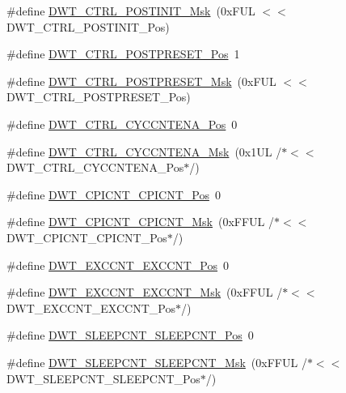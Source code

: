 \begin{DoxyCompactItemize}
\item 
\#define \hyperlink{group___c_m_s_i_s___d_w_t_gab8cbbee1e1d94d09f9a1f86379a08ee8}{D\+W\+T\+\_\+\+C\+T\+R\+L\+\_\+\+P\+O\+S\+T\+I\+N\+I\+T\+\_\+\+Msk}~(0x\+F\+U\+L $<$$<$ D\+W\+T\+\_\+\+C\+T\+R\+L\+\_\+\+P\+O\+S\+T\+I\+N\+I\+T\+\_\+\+Pos)
\item 
\#define \hyperlink{group___c_m_s_i_s___d_w_t_ga129bc152febfddd67a0c20c6814cba69}{D\+W\+T\+\_\+\+C\+T\+R\+L\+\_\+\+P\+O\+S\+T\+P\+R\+E\+S\+E\+T\+\_\+\+Pos}~1
\item 
\#define \hyperlink{group___c_m_s_i_s___d_w_t_ga11d9e1e2a758fdd2657aa68ce61b9c9d}{D\+W\+T\+\_\+\+C\+T\+R\+L\+\_\+\+P\+O\+S\+T\+P\+R\+E\+S\+E\+T\+\_\+\+Msk}~(0x\+F\+U\+L $<$$<$ D\+W\+T\+\_\+\+C\+T\+R\+L\+\_\+\+P\+O\+S\+T\+P\+R\+E\+S\+E\+T\+\_\+\+Pos)
\item 
\#define \hyperlink{group___c_m_s_i_s___d_w_t_gaa4509f5f8514a7200be61691f0e01f10}{D\+W\+T\+\_\+\+C\+T\+R\+L\+\_\+\+C\+Y\+C\+C\+N\+T\+E\+N\+A\+\_\+\+Pos}~0
\item 
\#define \hyperlink{group___c_m_s_i_s___d_w_t_ga4a9d209dc2a81ea6bfa0ea21331769d3}{D\+W\+T\+\_\+\+C\+T\+R\+L\+\_\+\+C\+Y\+C\+C\+N\+T\+E\+N\+A\+\_\+\+Msk}~(0x1\+U\+L /$\ast$$<$$<$ D\+W\+T\+\_\+\+C\+T\+R\+L\+\_\+\+C\+Y\+C\+C\+N\+T\+E\+N\+A\+\_\+\+Pos$\ast$/)
\item 
\#define \hyperlink{group___c_m_s_i_s___d_w_t_ga80e9ad8f6a9e2344af8a3cf989bebe3d}{D\+W\+T\+\_\+\+C\+P\+I\+C\+N\+T\+\_\+\+C\+P\+I\+C\+N\+T\+\_\+\+Pos}~0
\item 
\#define \hyperlink{group___c_m_s_i_s___d_w_t_ga76f39e7bca3fa86a4dbf7b8f6adb7217}{D\+W\+T\+\_\+\+C\+P\+I\+C\+N\+T\+\_\+\+C\+P\+I\+C\+N\+T\+\_\+\+Msk}~(0x\+F\+F\+U\+L /$\ast$$<$$<$ D\+W\+T\+\_\+\+C\+P\+I\+C\+N\+T\+\_\+\+C\+P\+I\+C\+N\+T\+\_\+\+Pos$\ast$/)
\item 
\#define \hyperlink{group___c_m_s_i_s___d_w_t_ga031c693654030d4cba398b45d2925b1d}{D\+W\+T\+\_\+\+E\+X\+C\+C\+N\+T\+\_\+\+E\+X\+C\+C\+N\+T\+\_\+\+Pos}~0
\item 
\#define \hyperlink{group___c_m_s_i_s___d_w_t_ga057fa604a107b58a198bbbadb47e69c9}{D\+W\+T\+\_\+\+E\+X\+C\+C\+N\+T\+\_\+\+E\+X\+C\+C\+N\+T\+\_\+\+Msk}~(0x\+F\+F\+U\+L /$\ast$$<$$<$ D\+W\+T\+\_\+\+E\+X\+C\+C\+N\+T\+\_\+\+E\+X\+C\+C\+N\+T\+\_\+\+Pos$\ast$/)
\item 
\#define \hyperlink{group___c_m_s_i_s___d_w_t_ga0371a84a7996dc5852c56afb2676ba1c}{D\+W\+T\+\_\+\+S\+L\+E\+E\+P\+C\+N\+T\+\_\+\+S\+L\+E\+E\+P\+C\+N\+T\+\_\+\+Pos}~0
\item 
\#define \hyperlink{group___c_m_s_i_s___d_w_t_ga1e340751d71413fef400a0a1d76cc828}{D\+W\+T\+\_\+\+S\+L\+E\+E\+P\+C\+N\+T\+\_\+\+S\+L\+E\+E\+P\+C\+N\+T\+\_\+\+Msk}~(0x\+F\+F\+U\+L /$\ast$$<$$<$ D\+W\+T\+\_\+\+S\+L\+E\+E\+P\+C\+N\+T\+\_\+\+S\+L\+E\+E\+P\+C\+N\+T\+\_\+\+Pos$\ast$/)

\end{DoxyCompactItemize}
